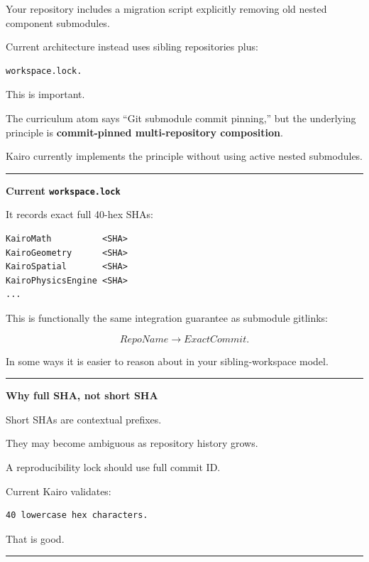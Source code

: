 Your repository includes a migration script explicitly removing old nested component submodules.

Current architecture instead uses sibling repositories plus:

\begin{verbatim}
workspace.lock.
\end{verbatim}

This is important.

The curriculum atom says ``Git submodule commit pinning,'' but the underlying principle is \textbf{commit-pinned multi-repository composition}.

Kairo currently implements the principle without using active nested submodules.

\begin{center}\rule{0.5\linewidth}{0.5pt}\end{center}

\textbf{Current \texttt{workspace.lock}}

It records exact full 40-hex SHAs:

\begin{verbatim}
KairoMath          <SHA>
KairoGeometry      <SHA>
KairoSpatial       <SHA>
KairoPhysicsEngine <SHA>
...
\end{verbatim}

This is functionally the same integration guarantee as submodule gitlinks:

\[
RepoName
\rightarrow
ExactCommit.
\]

In some ways it is easier to reason about in your sibling-workspace model.

\begin{center}\rule{0.5\linewidth}{0.5pt}\end{center}

\textbf{Why full SHA, not short SHA}

Short SHAs are contextual prefixes.

They may become ambiguous as repository history grows.

A reproducibility lock should use full commit ID.

Current Kairo validates:

\begin{verbatim}
40 lowercase hex characters.
\end{verbatim}

That is good.

\begin{center}\rule{0.5\linewidth}{0.5pt}\end{center}

